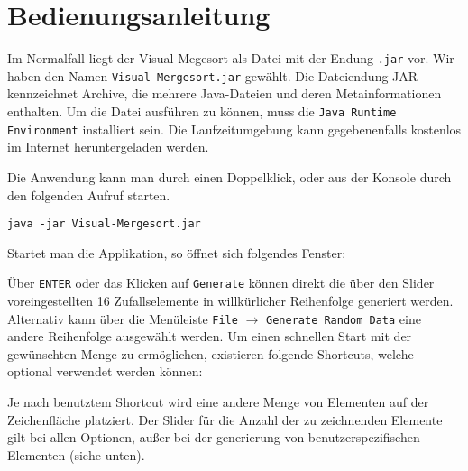 \chapter{Bedienungsanleitung}\label{chap:bedienungsanleitung}

Im Normalfall liegt der Visual-Megesort als Datei mit der Endung \texttt{.jar} vor. Wir haben den Namen \texttt{Visual-Mergesort.jar} gewählt. Die Dateiendung JAR kennzeichnet Archive, die mehrere Java-Dateien und deren Metainformationen enthalten. Um die Datei ausführen zu können, muss die \texttt{Java Runtime Environment} installiert sein. Die Laufzeitumgebung kann gegebenenfalls kostenlos im Internet heruntergeladen werden.

Die Anwendung kann man durch einen Doppelklick, oder aus der Konsole durch den folgenden Aufruf starten.

\begin{verbatim}
java -jar Visual-Mergesort.jar
\end{verbatim}

Startet man die Applikation, so öffnet sich folgendes Fenster:


Über \texttt{ENTER} oder das Klicken auf \texttt{Generate} können direkt die über den Slider voreingestellten 16 Zufallselemente in willkürlicher Reihenfolge generiert werden. Alternativ kann über die Menüleiste \texttt{File} $\rightarrow$ \texttt{Generate Random Data} eine andere Reihenfolge ausgewählt werden. Um einen schnellen Start mit der gewünschten Menge zu ermöglichen, existieren folgende Shortcuts, welche optional verwendet werden können:

Je nach benutztem Shortcut wird eine andere Menge von Elementen auf der Zeichenfläche platziert. Der Slider für die Anzahl der zu zeichnenden Elemente gilt bei allen Optionen, außer bei der generierung von benutzerspezifischen Elementen (siehe unten).

